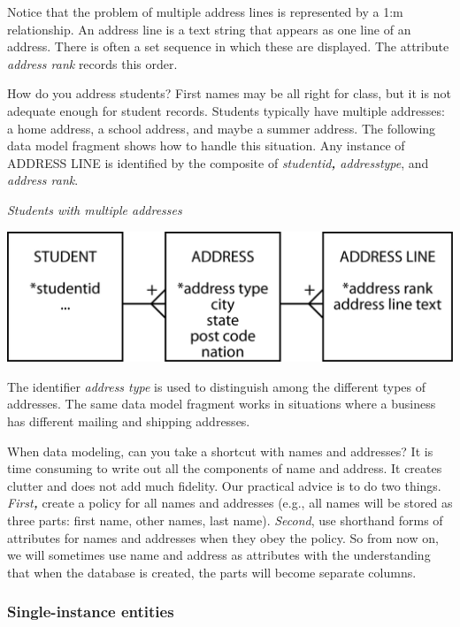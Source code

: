 \documentclass[
]{article}
\begin{document}
Notice that the problem of multiple address lines is represented by a
1:m relationship. An address line is a text string that appears as one
line of an address. There is often a set sequence in which these are
displayed. The attribute \emph{address rank} records this order.

How do you address students? First names may be all right for class, but
it is not adequate enough for student records. Students typically have
multiple addresses: a home address, a school address, and maybe a summer
address. The following data model fragment shows how to handle this
situation. Any instance of ADDRESS LINE is identified by the composite
of \emph{studentid\textbf{,} addresstype}, and \emph{address rank}.

\emph{Students with multiple addresses}

\includegraphics{Figures/Chapter 7/address-multiple.png}

The identifier \emph{address type} is used to distinguish among the different
types of addresses. The same data model fragment works in situations
where a business has different mailing and shipping addresses.

When data modeling, can you take a shortcut with names and addresses? It
is time consuming to write out all the components of name and address.
It creates clutter and does not add much fidelity. Our practical advice
is to do two things. \emph{First\textbf{,}} create a policy for all names and
addresses (e.g., all names will be stored as three parts: first name,
other names, last name). \emph{Second}, use shorthand forms of attributes for
names and addresses when they obey the policy. So from now on, we will
sometimes use name and address as attributes with the understanding that
when the database is created, the parts will become separate columns.

\hypertarget{single-instance-entities}{%
\subsubsection*{Single-instance entities}\label{single-instance-entities}}
\end{document}

